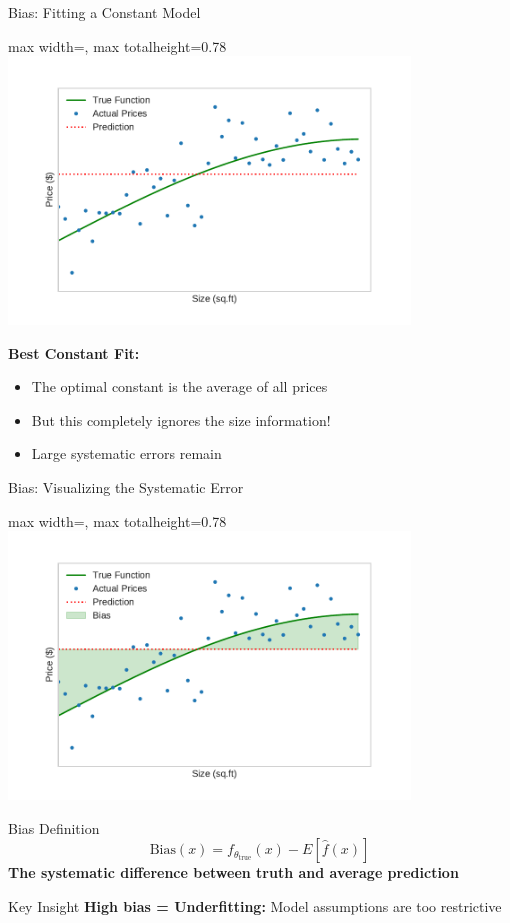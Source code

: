 \documentclass[10pt]{beamer}
\newcommand{\fitpic}[1]{\begin{adjustbox}{max width=\linewidth, max totalheight=0.78\textheight}#1\end{adjustbox}}
\begin{document}
\begin{frame}{Bias: Fitting a Constant Model}
\begin{center}
\fitpic{\includegraphics[width=0.8\textwidth]{../assets/bias-variance/figures/biasn_2.pdf}}
\end{center}

\begin{keypointsbox}
\textbf{Best Constant Fit:} 
\begin{itemize}
\item The optimal constant is the average of all prices
\item But this completely ignores the size information!
\item Large systematic errors remain
\end{itemize}
\end{keypointsbox}
\end{frame}

\begin{frame}{Bias: Visualizing the Systematic Error}
\begin{center}
\fitpic{\includegraphics[width=0.8\textwidth]{../assets/bias-variance/figures/biasn_3.pdf}}
\end{center}

\begin{definitionbox}{Bias Definition}
$$\text{Bias}(x) = f_{\theta_{\text{true}}}(x) - E[\hat{f}(x)]$$
\textbf{The systematic difference between truth and average prediction}
\end{definitionbox}

\begin{alertbox}{Key Insight}
\textbf{High bias = Underfitting:} Model assumptions are too restrictive
\end{alertbox}
\end{frame}
\end{document}
